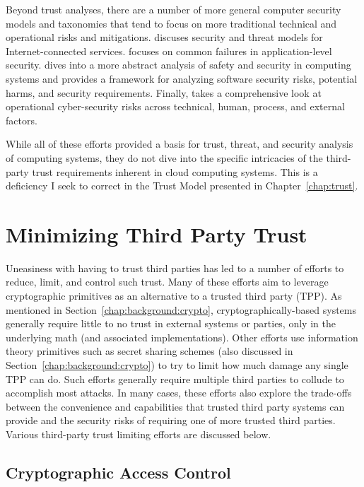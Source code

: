 Beyond trust analyses, there are a number of more general computer
security models and taxonomies that tend to focus on more traditional
technical and operational risks and mitigations. \cite{abbas2005}
discuses security and threat models for Internet-connected
services. \cite{tsipenyuk2005} focuses on common failures in
application-level security. \cite{firesmith2005} dives into a more
abstract analysis of safety and security in computing systems and
provides a framework for analyzing software security risks, potential
harms, and security requirements. Finally, \cite{cebula2010} takes a
comprehensive look at operational cyber-security risks across
technical, human, process, and external factors.

While all of these efforts provided a basis for trust, threat, and
security analysis of computing systems, they do not dive into the
specific intricacies of the third-party trust requirements inherent in
cloud computing systems. This is a deficiency I seek to correct in the
Trust Model presented in Chapter~\ref{chap:trust}.

\section{Minimizing Third Party Trust}
\label{chap:related:minimize}

Uneasiness with having to trust third parties has led to a number of
efforts to reduce, limit, and control such trust. Many of these
efforts aim to leverage cryptographic primitives as an alternative to
a trusted third party (TPP). As mentioned in
Section~\ref{chap:background:crypto}, cryptographically-based systems
generally require little to no trust in external systems or parties,
only in the underlying math (and associated implementations). Other
efforts use information theory primitives such as secret sharing
schemes (also discussed in Section~\ref{chap:background:crypto}) to
try to limit how much damage any single TPP can do. Such efforts
generally require multiple third parties to collude to accomplish most
attacks. In many cases, these efforts also explore the trade-offs
between the convenience and capabilities that trusted third party
systems can provide and the security risks of requiring one of more
trusted third parties. Various third-party trust limiting efforts are
discussed below.

\subsection{Cryptographic Access Control}

